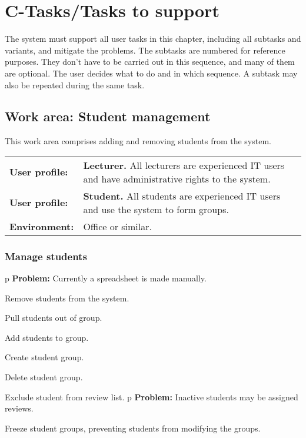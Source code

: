 \documentclass[Main]{subfiles}
\begin{document}
\chapter{C-Tasks/Tasks to support}\label{cha:C}
The system must support all user tasks in this chapter, including all subtasks and variants, and mitigate the problems. The subtasks are numbered for reference purposes. They don't have to be carried out in this sequence, and many of them are optional. The user decides what to do and in which sequence. A subtask may also be repeated during the same task.

\section{Work area: Student management}
This work area comprises adding and removing students from the system.

\begin{tabular}{l  p{13cm}}
 \textbf{User profile:} & \textbf{Lecturer.} All lecturers are experienced IT users and have administrative rights to the system. \\
 \textbf{User profile:} & \textbf{Student.} All students are experienced IT users and use the system to form groups.  \\
 \textbf{Environment:} & Office or similar.
\end{tabular}

\subsection{Manage students}\label{sec:ManageStudents}

\begin{DataIntro}
\end{DataIntro}


\begin{TaskTable}
\RecordAddi
{p}
{\textbf{Problem:} Currently a spreadsheet is made manually.}{}{}

\Record
{Remove students from the system.}{}{}

\Record
{Pull students out of group.}{}{}

\Record
{Add students to group.}{}{}

\Record
{Create student group.}{}{}

\Record
{Delete student group.}{}{}

\Record
{Exclude student from review list.}{}{}
\RecordAddi
{p}
{\textbf{Problem:} Inactive students may be assigned reviews.}{}{}

\Record
{Freeze student groups, preventing students from modifying the groups.}{}{}
\end{TaskTable}
\end{document}
